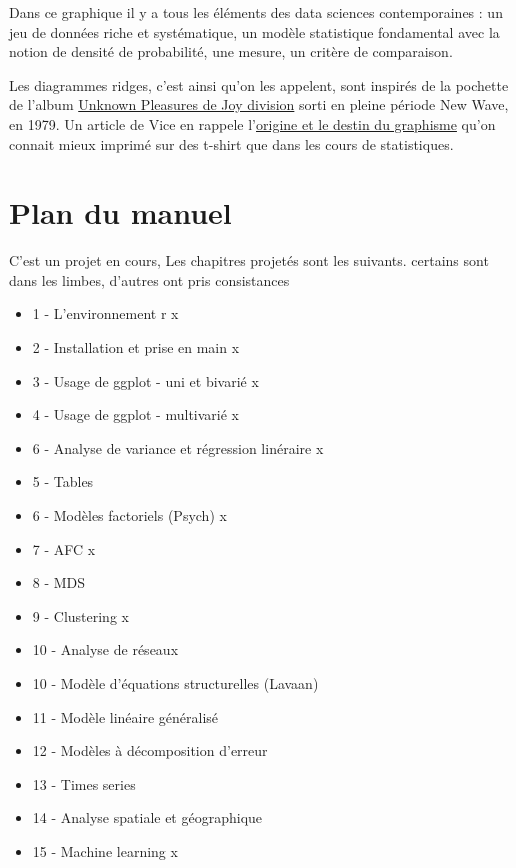 \documentclass[
]{book}
\providecommand{\tightlist}{%
  \setlength{\itemsep}{0pt}\setlength{\parskip}{0pt}}
\begin{document}
Dans ce graphique il y a tous les éléments des data sciences contemporaines : un jeu de données riche et systématique, un modèle statistique fondamental avec la notion de densité de probabilité, une mesure, un critère de comparaison.

Les diagrammes ridges, c'est ainsi qu'on les appelent, sont inspirés de la pochette de l'album \href{https://www.youtube.com/watch?v=7PtvIr2oiaE}{Unknown Pleasures de Joy division} sorti en pleine période New Wave, en 1979. Un article de Vice en rappele l'\href{https://i-d.vice.com/fr/article/pabjam/pourquoi-cette-pochette-dalbum-de-joy-division-a-inspire-le-monde-entier}{origine et le destin du graphisme} qu'on connait mieux imprimé sur des t-shirt que dans les cours de statistiques.

\hypertarget{plan-du-manuel}{%
\section{Plan du manuel}\label{plan-du-manuel}}

C'est un projet en cours, Les chapitres projetés sont les suivants. certains sont dans les limbes, d'autres ont pris consistances

\begin{itemize}
\tightlist
\item
  1 - L'environnement r x
\item
  2 - Installation et prise en main x
\item
  3 - Usage de ggplot - uni et bivarié x
\item
  4 - Usage de ggplot - multivarié x
\item
  6 - Analyse de variance et régression linéraire x
\item
  5 - Tables
\item
  6 - Modèles factoriels (Psych) x
\item
  7 - AFC x
\item
  8 - MDS\\
\item
  9 - Clustering x
\item
  10 - Analyse de réseaux
\item
  10 - Modèle d'équations structurelles (Lavaan)
\item
  11 - Modèle linéaire généralisé
\item
  12 - Modèles à décomposition d'erreur
\item
  13 - Times series
\item
  14 - Analyse spatiale et géographique
\item
  15 - Machine learning x
\end{itemize}
\end{document}
